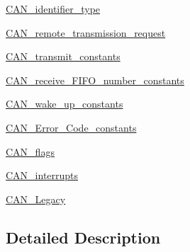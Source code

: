 \begin{DoxyCompactItemize}
\mbox{\hyperlink{group___c_a_n__identifier__type}{C\+A\+N\+\_\+identifier\+\_\+type}}
\item 
\mbox{\hyperlink{group___c_a_n__remote__transmission__request}{C\+A\+N\+\_\+remote\+\_\+transmission\+\_\+request}}
\item 
\mbox{\hyperlink{group___c_a_n__transmit__constants}{C\+A\+N\+\_\+transmit\+\_\+constants}}
\item 
\mbox{\hyperlink{group___c_a_n__receive___f_i_f_o__number__constants}{C\+A\+N\+\_\+receive\+\_\+\+F\+I\+F\+O\+\_\+number\+\_\+constants}}
\item 
\mbox{\hyperlink{group___c_a_n__wake__up__constants}{C\+A\+N\+\_\+wake\+\_\+up\+\_\+constants}}
\item 
\mbox{\hyperlink{group___c_a_n___error___code__constants}{C\+A\+N\+\_\+\+Error\+\_\+\+Code\+\_\+constants}}
\item 
\mbox{\hyperlink{group___c_a_n__flags}{C\+A\+N\+\_\+flags}}
\item 
\mbox{\hyperlink{group___c_a_n__interrupts}{C\+A\+N\+\_\+interrupts}}
\item 
\mbox{\hyperlink{group___c_a_n___legacy}{C\+A\+N\+\_\+\+Legacy}}
\end{DoxyCompactItemize}


\subsection{Detailed Description}
